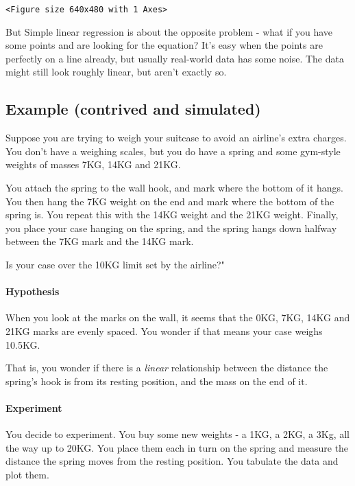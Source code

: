 \documentclass[11pt]{article}
\begin{document}
    
    \begin{verbatim}
<Figure size 640x480 with 1 Axes>
    \end{verbatim}

    
    But Simple linear regression is about the opposite problem - what if you
have some points and are looking for the equation? It's easy when the
points are perfectly on a line already, but usually real-world data has
some noise. The data might still look roughly linear, but aren't exactly
so.

    \subsection{Example (contrived and
simulated)}\label{example-contrived-and-simulated}

    Suppose you are trying to weigh your suitcase to avoid an airline's
extra charges. You don't have a weighing scales, but you do have a
spring and some gym-style weights of masses 7KG, 14KG and 21KG.

You attach the spring to the wall hook, and mark where the bottom of it
hangs. You then hang the 7KG weight on the end and mark where the bottom
of the spring is. You repeat this with the 14KG weight and the 21KG
weight. Finally, you place your case hanging on the spring, and the
spring hangs down halfway between the 7KG mark and the 14KG mark.

Is your case over the 10KG limit set by the airline?"

\paragraph{Hypothesis}\label{hypothesis}

When you look at the marks on the wall, it seems that the 0KG, 7KG, 14KG
and 21KG marks are evenly spaced. You wonder if that means your case
weighs 10.5KG.

That is, you wonder if there is a \emph{linear} relationship between the
distance the spring's hook is from its resting position, and the mass on
the end of it.

\paragraph{Experiment}\label{experiment}

You decide to experiment. You buy some new weights - a 1KG, a 2KG, a
3Kg, all the way up to 20KG. You place them each in turn on the spring
and measure the distance the spring moves from the resting position. You
tabulate the data and plot them.
\end{document}
